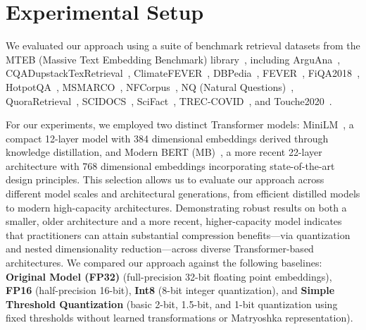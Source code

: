 \section{Experimental Setup}
\label{sec:experiments}

We evaluated our approach using a suite of benchmark retrieval datasets from the MTEB (Massive Text Embedding Benchmark) library~\cite{muennighoff2022mteb}, including ArguAna~\cite{wachsmuth-etal-2018-retrieval, thakur2021beir}, CQADupstackTexRetrieval~\cite{hoogeveen2015cqadupstack}, ClimateFEVER~\cite{diggelmann2020climatefever}, DBPedia~\cite{hasibi2017dbpedia}, FEVER~\cite{thorne2018fever}, FiQA2018~\cite{thakur2021beir}, HotpotQA~\cite{yang2018hotpotqa}, MSMARCO~\cite{nguyen2016ms}, NFCorpus~\cite{boteva2016full}, NQ (Natural Questions)~\cite{kwiatkowski2019natural}, QuoraRetrieval~\cite{iyer2017first, thakur2021beir}, SCIDOCS~\cite{specter2020cohan}, SciFact~\cite{wadden2020fact}, TREC-COVID~\cite{voorhees2021trec, thakur2021beir}, and Touche2020~\cite{bondarenko2020overview}.


For our experiments, we employed two distinct Transformer models: MiniLM~\cite{minilm, reimers-2019-sentence-bert}, a compact 12-layer model with 384 dimensional embeddings derived through knowledge distillation, and Modern BERT (MB)~\cite{modernbert, nussbaum2024nomic}, a more recent 22-layer architecture with 768 dimensional embeddings incorporating state-of-the-art design principles. 
This selection allows us to evaluate our approach across different model scales and architectural generations, from efficient distilled models to modern high-capacity architectures.
Demonstrating robust results on both a smaller, older architecture and a more recent, higher-capacity model indicates that practitioners can attain substantial compression benefits—via quantization and nested dimensionality reduction—across diverse Transformer-based architectures.
We compared our approach against the following baselines: \textbf{Original Model (FP32)} (full-precision 32-bit floating point embeddings), \textbf{FP16} (half-precision 16-bit), \textbf{Int8} (8-bit integer quantization), and \textbf{Simple Threshold Quantization} (basic 2-bit, 1.5-bit, and 1-bit quantization using fixed thresholds without learned transformations or Matryoshka representation).

